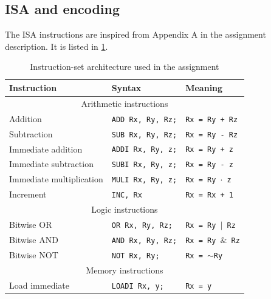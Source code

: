 \documentclass[a4paper, english]{article}
\numberwithin{equation}{section}
\begin{document}
\subsection{ISA and encoding}\label{sec:isa}
The ISA instructions are inspired from Appendix A in the assignment description. It is listed in \cref{tbl:ISA}.
\begin{table}[H]
    \centering
    \caption{Instruction-set architecture used in the assignment}\label{tbl:ISA}
    \begin{tabular}{lll}
        \toprule
        \textbf{Instruction}     & \textbf{Syntax}          & \textbf{Meaning}                  \\
        \midrule
        \multicolumn{3}{c}{Arithmetic instructions}                                             \\
        \midrule
        Addition                 & \texttt{ADD Rx, Ry, Rz;} & \texttt{Rx = Ry + Rz}             \\
        Subtraction              & \texttt{SUB Rx, Ry, Rz;} & \texttt{Rx = Ry - Rz}             \\
        Immediate addition       & \texttt{ADDI Rx, Ry, z;} & \texttt{Rx = Ry + z}              \\
        Immediate subtraction    & \texttt{SUBI Rx, Ry, z;} & \texttt{Rx = Ry - z}              \\
        Immediate multiplication & \texttt{MULI Rx, Ry, z;} & \texttt{Rx = Ry \(\cdot\) z}      \\
        Increment                & \texttt{INC, Rx}         & \texttt{Rx = Rx + 1}              \\
        \midrule
        \multicolumn{3}{c}{Logic instructions}                                                  \\
        \midrule
        Bitwise OR               & \texttt{OR Rx, Ry, Rz;}  & \texttt{Rx = Ry \(\vert\) Rz}     \\
        Bitwise AND              & \texttt{AND Rx, Ry, Rz;} & \texttt{Rx = Ry \(\&\) Rz}        \\
        Bitwise NOT              & \texttt{NOT Rx, Ry;}     & \texttt{Rx = \(\sim\)Ry}          \\
        \midrule
        \multicolumn{3}{c}{Memory instructions}                                                 \\
        \midrule
        Load immediate           & \texttt{LOADI Rx, y;}    & \texttt{Rx = y}                   \\

\end{tabular}
\end{table}
\end{document}
